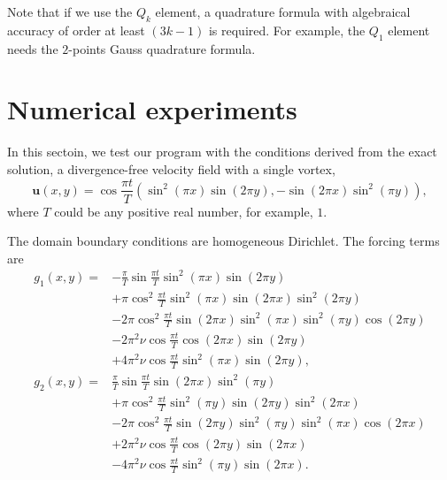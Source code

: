 \documentclass[lang=en,11pt,a4paper]{elegantpaper}
\begin{document}
Note that if we use the $Q_k$ element, a quadrature formula with algebraical accuracy of order at 
least $(3k-1)$ is required. For example, the $Q_1$ element needs the $2$-points Gauss quadrature formula.

\section{Numerical experiments}

In this sectoin, we test our program with the conditions derived from the exact solution, 
a divergence-free velocity field with a single vortex,
\begin{equation}
    \mathbf{u}(x,y)=\cos\frac{\pi t}{T}(\sin^2(\pi x)\sin(2\pi y),-\sin(2\pi x)\sin^2(\pi y)),
\end{equation}
where $T$ could be any positive real number, for example, $1$.

The domain boundary conditions are homogeneous Dirichlet. The forcing terms are
\begin{align}
    g_1(x,y) =& -\frac{\pi}{T}\sin\frac{\pi t}{T} \sin^2(\pi x) \sin(2\pi y) \nonumber \\
              & + \pi\cos^2\frac{\pi t}{T}\sin^2(\pi x)\sin(2\pi x)\sin^2(2\pi y) \nonumber \\
              & - 2\pi\cos^2\frac{\pi t}{T}\sin(2\pi x)\sin^2(\pi x)\sin^2(\pi y)\cos(2\pi y) \nonumber \\
              & - 2\pi^2\nu \cos\frac{\pi t}{T}\cos(2\pi x)\sin(2\pi y) \nonumber \\
              & + 4\pi^2\nu \cos\frac{\pi t}{T}\sin^2(\pi x)\sin(2\pi y),\\
    g_2(x,y) =& \frac{\pi}{T}\sin\frac{\pi t}{T} \sin(2\pi x) \sin^2(\pi y) \nonumber \\
              & + \pi\cos^2\frac{\pi t}{T}\sin^2(\pi y)\sin(2\pi y)\sin^2(2\pi x) \nonumber \\
              & - 2\pi\cos^2\frac{\pi t}{T}\sin(2\pi y)\sin^2(\pi y)\sin^2(\pi x)\cos(2\pi x) \nonumber \\
              & + 2\pi^2\nu \cos\frac{\pi t}{T}\cos(2\pi y)\sin(2\pi x) \nonumber \\
              & - 4\pi^2\nu \cos\frac{\pi t}{T}\sin^2(\pi y)\sin(2\pi x).
\end{align}
\end{document}

